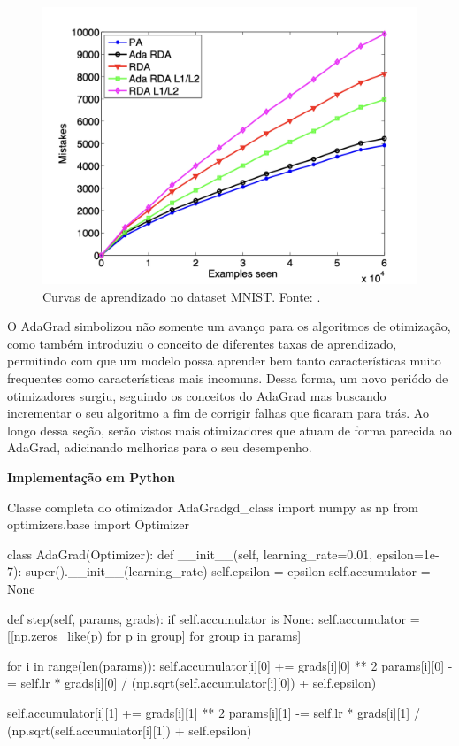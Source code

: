 \begin{figure}[h]
    \centering
    \includegraphics[width=0.65\linewidth]{../imagens/retropropagacao-gradiente/comparativo-adagrad-mnist.png}
    
    \caption[Curvas de aprendizado no MNIST]{%
        Curvas de aprendizado no dataset MNIST.
        \newline %
        \small Fonte: \parencite{AdaGradMethod}.
    }
    \label{fig:curvas-de-aprendizado-adagrad-mnist}
\end{figure}

O AdaGrad simbolizou não somente um avanço para os algoritmos de otimização, como também introduziu o conceito de diferentes taxas de aprendizado, permitindo com que um modelo possa aprender bem tanto características muito frequentes como características mais incomuns. Dessa forma, um novo periódo de otimizadores surgiu, seguindo os conceitos do AdaGrad mas buscando incrementar o seu algoritmo a fim de corrigir falhas que ficaram para trás. Ao longo dessa seção, serão vistos mais otimizadores que atuam de forma parecida ao AdaGrad, adicinando melhorias para o seu desempenho.

\textbf{Implementação em Python}

\begin{codelisting}{Classe completa do otimizador AdaGrad}{gd_class}
import numpy as np
from optimizers.base import Optimizer

class AdaGrad(Optimizer):
    def __init__(self, learning_rate=0.01, epsilon=1e-7):
        super().__init__(learning_rate)
        self.epsilon = epsilon
        self.accumulator = None

    def step(self, params, grads):
        if self.accumulator is None:
            self.accumulator = [[np.zeros_like(p) for p in group] for group in params]

        for i in range(len(params)):
            self.accumulator[i][0] += grads[i][0] ** 2
            params[i][0] -= self.lr * grads[i][0] / (np.sqrt(self.accumulator[i][0]) + self.epsilon)

            self.accumulator[i][1] += grads[i][1] ** 2
            params[i][1] -= self.lr * grads[i][1] / (np.sqrt(self.accumulator[i][1]) + self.epsilon)
\end{codelisting}

